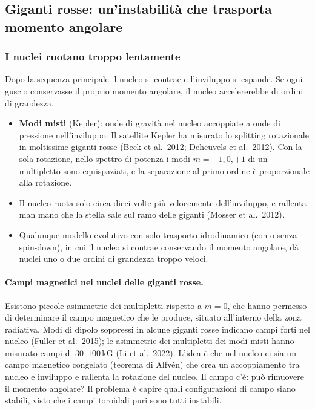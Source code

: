 \subsection{Giganti rosse: un'instabilità che trasporta momento angolare}

\subsubsection{I nuclei ruotano troppo lentamente}

Dopo la sequenza principale il nucleo si contrae e l'inviluppo si espande. Se ogni guscio conservasse il proprio momento angolare, il nucleo accelererebbe di ordini di grandezza.
\begin{itemize}
\item \textbf{Modi misti} (Kepler): onde di gravità nel nucleo accoppiate a onde di pressione nell'inviluppo. Il satellite Kepler ha misurato lo splitting rotazionale in moltissime giganti rosse (Beck et al.\ 2012; Deheuvels et al.\ 2012). Con la sola rotazione, nello spettro di potenza i modi $m=-1,0,+1$ di un multipletto sono equispaziati, e la separazione al primo ordine è proporzionale alla rotazione.
\item Il nucleo ruota solo circa dieci volte più velocemente dell'inviluppo, e rallenta man mano che la stella sale sul ramo delle giganti (Mosser et al.\ 2012).
\item Qualunque modello evolutivo con solo trasporto idrodinamico (con o senza spin-down), in cui il nucleo si contrae conservando il momento angolare, dà nuclei uno o due ordini di grandezza troppo veloci.
\end{itemize}

\paragraph{Campi magnetici nei nuclei delle giganti rosse.} Esistono piccole asimmetrie dei multipletti rispetto a $m=0$, che hanno permesso di determinare il campo magnetico che le produce, situato all'interno della zona radiativa. Modi di dipolo soppressi in alcune giganti rosse indicano campi forti nel nucleo (Fuller et al.\ 2015); le asimmetrie dei multipletti dei modi misti hanno misurato campi di $30$--$100\,$kG (Li et al.\ 2022). L'idea è che nel nucleo ci sia un campo magnetico congelato (teorema di Alfvén) che crea un accoppiamento tra nucleo e inviluppo e rallenta la rotazione del nucleo. Il campo c'è: può rimuovere il momento angolare? Il problema è capire quali configurazioni di campo siano stabili, visto che i campi toroidali puri sono tutti instabili.

